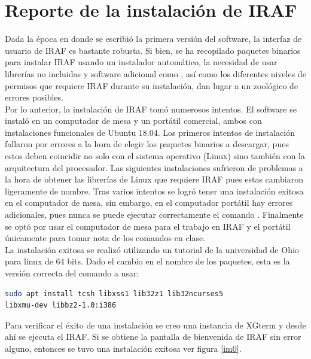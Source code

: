 \documentclass[12pt]{article}
\begin{document}
\section{Reporte de la instalación de IRAF}
Dada la época en donde se escribió la primera versión del software, la interfaz de usuario de IRAF es bastante robusta. Si bien, se ha recopilado paquetes binarios para instalar IRAF usando un instalador automático, la necesidad de usar librerías no incluidas y software adicional como , así como los diferentes niveles de permisos que requiere IRAF durante su instalación, dan lugar a un zoológico de errores posibles.\\
Por lo anterior, la instalación de IRAF tomó numerosos intentos. El software se instaló en un computador de mesa y un portátil comercial, ambos con instalaciones funcionales de Ubuntu 18.04. Los primeros intentos de instalación fallaron por errores a la hora de elegir los paquetes binarios a descargar, pues estos deben coincidir no solo con el sistema operativo (Linux) sino también con la arquitectura del procesador. Las siguientes instalaciones sufrieron de problemas a la hora de obtener las librerías de Linux que requiere IRAF pues estas cambiaron ligeramente de nombre. Tras varios intentos se logró tener una instalación exitosa en el computador de mesa, sin embargo, en el computador portátil hay errores adicionales, pues nunca se puede ejecutar correctamente el comando . Finalmente se optó por usar el computador de mesa para el trabajo en IRAF y el portátil únicamente para tomar nota de los comandos en clase.\\
La instalación exitosa se realizó utilizando un tutorial de la universidad de Ohio para linux de 64 bits\cite{OhioTutorial}. Dado el cambio en el nombre de los paquetes, esta es la versión correcta del comando a usar:

\begin{lstlisting}[language=bash]
sudo apt install tcsh libxss1 lib32z1 lib32ncurses5 
libxmu-dev libbz2-1.0:i386 
\end{lstlisting}

Para verificar el éxito de una instalación se creo una instancia de XGterm y desde ahí se ejecuta el IRAF. Si se obtiene la pantalla de bienvenida de IRAF sin error alguno, entonces se tuvo una instalación exitosa ver figura \ref{im0}.
\end{document}
